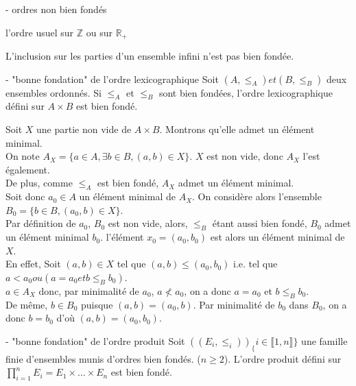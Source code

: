 \begin{exemple}{6.24}{- ordres non bien fondés}
    \item l'ordre usuel sur $\mathbb{Z}$ ou sur $\mathbb{R_+}$
    \item L'inclusion sur les parties d'un ensemble infini n'est pas bien fondée.
\end{exemple}

\begin{proposition}{6.26}{- "bonne fondation" de l'ordre lexicographique}
    Soit $(A,\leq_A) et (B,\leq_B)$ deux ensembles ordonnés.
    Si $\leq_A$ et $\leq_B$ sont bien fondées, l'ordre lexicographique défini sur $A \times B$ est bien fondé.
\end{proposition}


    \begin{demonstration}
        Soit $X$ une partie non vide de $A \times B$. Montrons qu'elle admet un élément minimal.\\
        On note $A_X = \{a \in A, \exists b \in B, (a,b) \in X\}$. $X$ est non vide, donc $A_X$ l'est également.\\
        De plus, comme $\leq_A$ est bien fondé, $A_X$ admet un élément minimal.\\
        Soit donc $a_0 \in A$ un élément minimal de $A_X$. On considère alors l'ensemble $B_0 = \{b \in B, (a_0,b) \in X\}$.\\
        Par définition de $a_0$, $B_0$ est non vide, alors, $\leq_B$ étant aussi bien fondé, $B_0$ admet un élément minimal $b_0$. l'élément $x_0 = (a_0, b_0)$ est alors un élément minimal de $X$.\\
        En effet, Soit $(a,b) \in X$ tel que $(a,b) \leq (a_0,b_0)$ i.e. tel que $a < a_0 ou (a = a_0 et b \leq_B b_0)$.\\
        $a \in A_X$ donc, par minimalité de $a_0$, $a \nless a_0$, on a donc $a = a_0$ et $b \leq_B b_0$.\\
        De même, $b \in B_0$ puisque $(a,b) = (a_0,b)$. Par minimalité de $b_0$ dans $B_0$, on a donc $b = b_0$ d'où $(a,b) = (a_0,b_0)$.
    \end{demonstration}
    

    \begin{proposition}{6.27}{ - "bonne fondation" de l'ordre produit}
        Soit $((E_i,\leq_i))_\{i \in \llbracket 1,n \rrbracket \}$ une famille finie d'ensembles munis d'ordres bien fondés. ($n \geq 2$). L'ordre produit défini sur $\displaystyle \prod_{i=1}^{n}E_i = E_1 \times \ldots \times E_n$ est bien fondé.
    \end{proposition}

